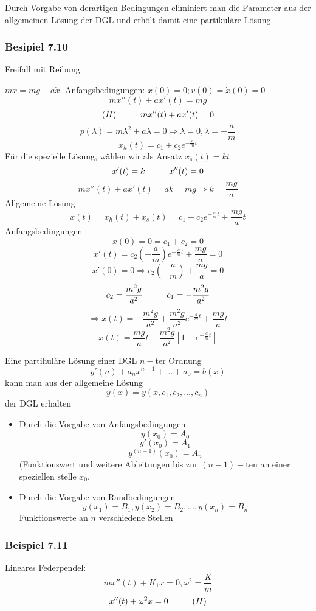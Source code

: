 \begin{enumerate}
Durch Vorgabe von derartigen Bedingungen eliminiert man die Parameter aus der allgemeinen Lösung der DGL und erhölt damit eine partikuläre Lösung.
\subsubsection*{Besipiel 7.10}
Freifall mit Reibung 
\begin{center}
\end{center}
$m\ddot{x}=mg-a\dot{x}$. Anfangsbedingungen: $x(0)=0; v(0)=\dot{x}(0)=0$
$$mx''(t)+ax'(t)=mg$$
$$(H)\hspace{10mm}mx''(t)+ax'(t)=0$$
$$p(\lambda)=m\lambda^2+a\lambda=0\Rightarrow \lambda=0,\lambda=-\frac{a}{m}$$
$$x_h(t)=c_1+c_2e^{-\frac{a}{m}t}$$
Für die spezielle Lösung, wählen wir als Ansatz $x_s(t)=kt$ 
$$x'(t)=k\hspace{10mm}x''(t)=0$$
$$mx''(t)+ax'(t)=ak=mg\Rightarrow k=\frac{mg}{a}$$
Allgemeine Lösung 
$$x(t)=x_h(t)+x_s(t)=c_1+c_2e^{-\frac{a}{m}t}+\frac{mg}{a}t$$
Anfangsbedingungen
$$x(0)=0=c_1+c_2=0$$
$$x'(t)=c_2\left(-\frac{a}{m}\right)e^{-\frac{a}{m}t}+\frac{mg}{a}=0$$
$$x'(0)=0\Rightarrow c_2\left( -\frac{a}{m}\right) +\frac{mg}{a}=0$$
$$c_2=\frac{m^2g}{a^2}\hspace{10mm}c_1=-\frac{m^2g}{a^2}$$
$$\Rightarrow x(t)=-\frac{m^2g}{a^2}+\frac{m^2g}{a^2}e^{-\frac{a}{m}t}+\frac{mg}{a}t$$
$$x(t)=\frac{mg}{a}t-\frac{m^2g}{a^2}\left[ 1-e^{-\frac{a}{m}t}\right]$$
\end{enumerate}
Eine partihuläre Lösung einer DGL $n-$ter Ordnung $$y'{(n)}+a_nx^{n-1}+\dots+a_0=b(x)$$ kann man aus der allgemeine Lösung 
$$y(x)=y(x,c_1,c_2,\dots,c_n)$$ der DGL erhalten
\begin{itemize}
\item Durch die Vorgabe von Anfangsbedingungen 
$$y(x_0)=A_0$$
$$y'(x_0)=A_1$$
$$y^{(n-1)}(x_0)=A_n$$
(Funktionswert und weitere Ableitungen bis zur $(n-1)-$ten an einer speziellen stelle $x_0$.
\item Durch die Vorgabe von Randbedingungen 
$$y(x_1)=B_1, y(x_2)=B_2, \dots, y(x_n)=B_n$$ Funktionswerte an $n$ verschiedene Stellen
\end{itemize}
\subsubsection*{Beispiel 7.11}
Lineares Federpendel:
$$mx''(t)+K_1x=0, \omega^2=\frac{K}{m}$$
$$x''(t)+\omega^2x=0\hspace{10mm}(H)$$
